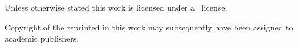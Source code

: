 
\begin{center}
    \begin{minipage}[c][\textheight-3em][b]{\textwidth-10em-2em}
        Unless otherwise stated this work is licensed under a \doclicenseLongNameRef~license.
    \end{minipage}
    \hfill
    \begin{minipage}[c][\textheight-3em][b]{10em}
        \doclicenseImage
    \end{minipage}
    
    \begin{minipage}[c][3em][b]{\textwidth}
        Copyright of the  reprinted in 
        this work may subsequently have been assigned to academic publishers.
    \end{minipage}
\end{center}
